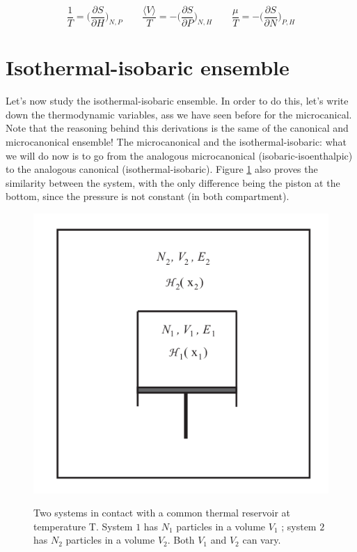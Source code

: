 	$$\frac{1}{T} = \biggl(\frac{\partial S}{\partial H}\biggr)_{N, P}\qquad \frac{\langle V\rangle}{T} = -\biggl(\frac{\partial S}{\partial P}\biggr)_{N, H}\qquad \frac{\mu}{T} = -\biggl(\frac{\partial S}{\partial N}\biggr)_{P, H}$$

\section{Isothermal-isobaric ensemble}
Let's now study the isothermal-isobaric ensemble. In order to do this, let's write down the thermodynamic variables, ass we have seen before for the microcanical.
Note that the reasoning behind this derivations is the same of the canonical and microcanonical ensemble! 
The microcanonical and the isothermal-isobaric: what we will do now is to go from the analogous microcanonical (isobaric-isoenthalpic) to the analogous canonical (isothermal-isobaric). 
Figure \ref{fig:isobar} also proves the similarity between the system, with the only difference being the piston at the bottom, since the pressure is not constant (in both compartment).

\begin{figure}
\center
\includegraphics[scale=0.4]{isobar}
\label{fig:isobar}
\caption{Two systems in contact with a common thermal reservoir at temperature T. System
$1$ has $N_1$ particles in a volume $V_1$ ; system $2$ has $N_2$ particles in a volume $V_2$. Both $V_1$ and $V_2$ can vary.}
\end{figure}

